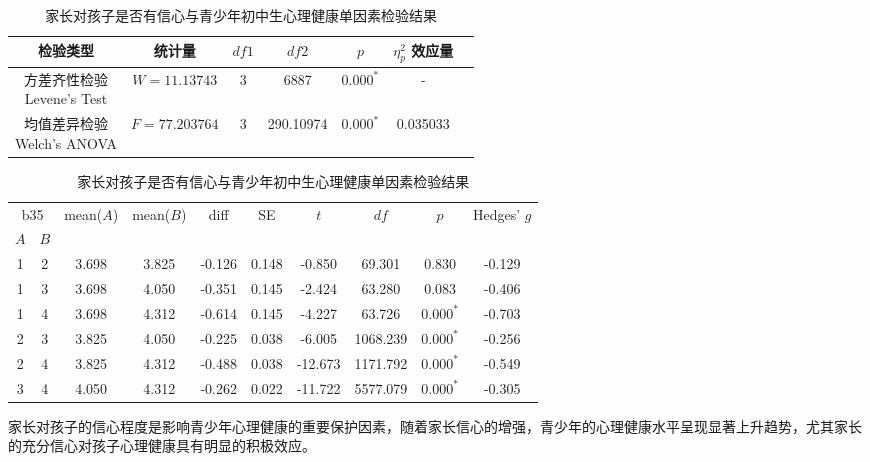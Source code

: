 \documentclass[zihao = -4, linespread = 1.5]{article}
\begin{document}
\begin{table}[htbp]
    \centering
    \setlength{\tabcolsep}{8pt}
    \renewcommand{\arraystretch}{1.2}
    \caption{家长对孩子是否有信心与青少年初中生心理健康单因素检验结果}\label{table-anova-pconfidence-health}
    \begin{tabular}{ccccccc}
        \bottomrule[1.5pt]
        检验类型 & 统计量 & $df1$ & $df2$ & $p$ & $\eta^2_p$ 效应量 \\
        \midrule[0.75pt]
        \makecell{方差齐性检验 \\ Levene's Test} & $W=11.13743$ & 3 & 6887 & $\bm{0.000^{*}}$ & - \\
        \midrule[0.75pt]
        \makecell{均值差异检验 \\ Welch's ANOVA} & $F=77.203764$ & 3 & 290.10974 & $\bm{0.000^{*}}$ & 0.035033 \\
    \end{tabular}
    \setlength{\tabcolsep}{6pt}
    \renewcommand{\arraystretch}{1.2}
    \begin{tabular}{cccccccccc}
        \bottomrule[1.5pt]
        \multicolumn{2}{c}{b35} & \multirow{2}{*}{mean($A$)} & \multirow{2}{*}{mean($B$)} & \multirow{2}{*}{diff} & \multirow{2}{*}{SE} & \multirow{2}{*}{$t$} & \multirow{2}{*}{$df$} & \multirow{2}{*}{$p$} & \multirow{2}{*}{Hedges' $g$} \\
        \cmidrule[0.75pt](lr){1-2}
        $A$ & $B$ \\
        \midrule[0.75pt]
        1 & 2 & 3.698 & 3.825 & -0.126 & 0.148 & -0.850 & 69.301 & 0.830 & -0.129 \\
        1 & 3 & 3.698 & 4.050 & -0.351 & 0.145 & -2.424 & 63.280 & 0.083 & -0.406 \\
        1 & 4 & 3.698 & 4.312 & -0.614 & 0.145 & -4.227 & 63.726 & $\bm{0.000^{*}}$ & -0.703 \\
        2 & 3 & 3.825 & 4.050 & -0.225 & 0.038 & -6.005 & 1068.239 & $\bm{0.000^{*}}$ & -0.256 \\
        2 & 4 & 3.825 & 4.312 & -0.488 & 0.038 & -12.673 & 1171.792 & $\bm{0.000^{*}}$ & -0.549 \\
        3 & 4 & 4.050 & 4.312 & -0.262 & 0.022 & -11.722 & 5577.079 & $\bm{0.000^{*}}$ & -0.305 \\
        \toprule[1.5pt]
    \end{tabular}
\end{table}

家长对孩子的信心程度是影响青少年心理健康的重要保护因素，随着家长信心的增强，青少年的心理健康水平呈现显著上升趋势，尤其家长的充分信心对孩子心理健康具有明显的积极效应。
\end{document}
